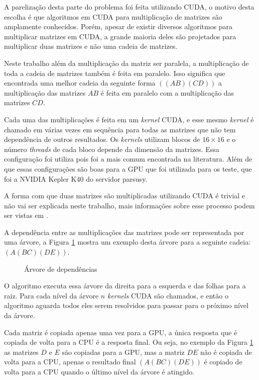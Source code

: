 \documentclass[12pt,openright,oneside,chapter=TITLE,section=TITLE,
    brazil]{utfpr-pg}
\begin{document}
A parelização desta parte do problema foi feita utilizando CUDA, o motivo desta escolha é que algoritmos em CUDA para multiplicação de matrizes são amplamente conhecidos. Porém, apesar de existir diversos algoritmos para multiplicar matrizes em CUDA, a grande maioria deles são projetados para multiplicar duas matrizes e não uma cadeia de matrizes. 

Neste trabalho além da multiplicação da matriz ser paralela, a multiplicação de toda a cadeia de matrizes também é feita em paralelo. Isso significa que encontrada uma melhor cadeia da seguinte forma $((AB)(CD))$ a multiplicação das matrizes $AB$ é feita em paralelo com a multiplicação das matrizes $CD$.

Cada uma das multiplicações é feita em um \emph{kernel} CUDA, e esse mesmo \emph{kernel} é chamado em várias vezes em sequência para todas as matrizes que não tem dependência de outros resultados. Os \emph{kernels} utilizam blocos de $16 \times 16$ e o número \emph{threads} de cada bloco depende da dimensão da matrizes. Essa configuração foi utiliza pois foi a mais comum encontrada na literatura. Além de que essas configurações são boas para a GPU que foi utilizada para os teste, que foi a NVIDIA Kepler K40 do servidor parsusy.

A forma com que duas matrizes são multiplicadas utilizando CUDA é trivial e não vai ser explicada neste trabalho, mais informações sobre esse processo podem ser vistas em .

A dependência entre as multiplicações das matrizes pode ser representada por uma árvore, a Figura \ref{fig:arvore} mostra um exemplo desta árvore para a seguinte cadeia: $(A(BC)(DE))$.

\begin{figure}[h]
	\centering	
	{%
	}%
	\vspace{-0.3cm}
	\caption{Árvore de dependências} \label{fig:arvore}
\end{figure}

O algoritmo executa essa árvore da direita para a esquerda e das folhas para a raiz.  Para cada nível da árvore $n$ \emph{kernels} CUDA são chamados, e então o algoritmo aguarda todos eles serem resolvidos para passar para o próximo nível da árvore. 

Cada matriz é copiada apenas uma vez para a GPU, a única resposta que é copiada de volta para a CPU é a resposta final. Ou seja, no exemplo da Figura \ref{fig:arvore} as matrizes $D$ e $E$ são copiadas para a GPU, mas a matriz $DE$ não é copiada de volta para a CPU, apenas o resultado final $(A(BC)(DE))$ é copiado de volta para a CPU quando o último nível da árvore é atingido.
\end{document}
